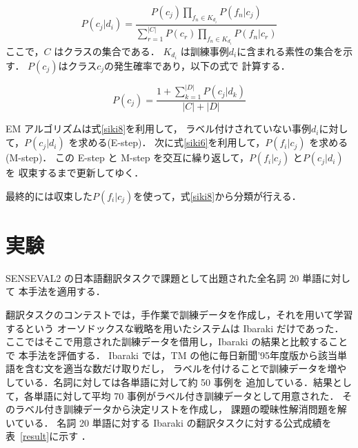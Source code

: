 \begin{equation}
    \label{siki8}
P(c_j|d_i) = \frac{P(c_j) \prod_{f_n \in K_{d_i}}P(f_n|c_j)}{\sum_{r = 1}^{|C|} P(c_r)\prod_{f_n \in K_{d_i}}P(f_n|c_r)}
\end{equation}
\noindent
ここで，\( C \) はクラスの集合である．
\( K_{d_i} \) は訓練事例\( d_i \)に含まれる素性の集合を示す．
\( P(c_j) \)はクラス\( c_j \)の発生確率であり，以下の式で
計算する．

\[
P(c_j) = \frac{1 + \sum_{k = 1}^{|D|} P(c_j|d_k)}{|C| + |D|}
\]

EM アルゴリズムは\mbox{式\ref{siki8}}を利用して，
ラベル付けされていない事例\( d_i \)に対して，\( P(c_j|d_i) \) を求める(E-step)．
次に\mbox{式\ref{siki6}}を利用して，\( P(f_i|c_j) \) を求める(M-step)．
この E-step と M-step を交互に繰り返して，\( P(f_i|c_j) \) と\( P(c_j|d_i) \) を
収束するまで更新してゆく．

最終的には収束した\( P(f_i|c_j) \)を使って，\mbox{式\ref{siki8}}から分類が行える．


\section{実験}


SENSEVAL2 の日本語翻訳タスクで課題として出題された全名詞 20 単語に対して
本手法を適用する．

翻訳タスクのコンテストでは，手作業で訓練データを作成し，それを用いて学習するという
オーソドックスな戦略を用いたシステムは Ibaraki だけであった．
ここではそこで用意された訓練データを借用し，Ibaraki の結果と比較することで
本手法を評価する．
Ibaraki では，TM の他に毎日新聞'95年度版から該当単語を含む文を適当な数だけ取りだし，
ラベルを付けることで訓練データを増やしている．名詞に対しては各単語に対して約 50 事例を
追加している．結果として，各単語に対して平均 70 事例がラベル付き訓練データとして用意された．
そのラベル付き訓練データから決定リスト\cite{Yarowsky1}を作成し，
課題の曖昧性解消問題を解いている．
名詞 20 単語に対する Ibaraki の翻訳タスクに対する公式成績を\mbox{表 \ref{result}}に示す
\cite{shinnou-sen2}．


